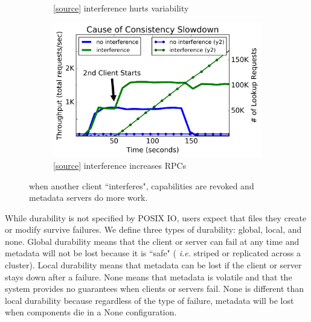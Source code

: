 \begin{figure}[t]
\begin{subfigure}[b]{.3\linewidth}
      \caption{[\href{https://github.com/michaelsevilla/cudele-popper/blob/revision/experiments/baseline-creates/visualize/viz.ipynb}{source}]
      interference hurts variability}
      \label{fig:overhead-b}
  \end{subfigure}
  \begin{subfigure}[b]{.3\linewidth}
      \centering
      \includegraphics[width=1.1\linewidth]{graphs/behavior-interfere.png}
      \caption{[\href{https://github.com/michaelsevilla/cudele-popper/blob/revision/experiments/baseline-interfere/visualize/viz.ipynb}{source}]
      interference increases RPCs}
      \label{fig:overhead-c}
  \end{subfigure}

  \caption{ when another client ``interferes", capabilities are revoked and metadata
servers do more work.} \label{fig:overhead}

\end{figure}

While durability is not specified by POSIX IO, users expect that files they
create or modify survive failures.  We define three types of durability:
global, local, and none.  Global durability means that the client or server can
fail at any time and metadata will not be lost because it is ``safe" ({\it
i.e.} striped or replicated across a cluster). Local durability means that
metadata can be lost if the client or server stays down after a failure. None
means that metadata is volatile and that the system provides no guarantees when
clients or servers fail.  None is different than local durability because
regardless of the type of failure, metadata will be lost when components die in a
None configuration.

